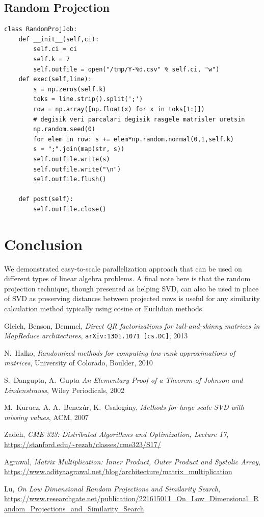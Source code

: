 \documentclass{article}
\begin{document}
\subsection{Random Projection}

\begin{verbatim}
class RandomProjJob:
    def __init__(self,ci):
        self.ci = ci
        self.k = 7
        self.outfile = open("/tmp/Y-%d.csv" % self.ci, "w")        
    def exec(self,line):
        s = np.zeros(self.k)
        toks = line.strip().split(';')
        row = np.array([np.float(x) for x in toks[1:]])
        # degisik veri parcalari degisik rasgele matrisler uretsin
        np.random.seed(0) 
        for elem in row: s += elem*np.random.normal(0,1,self.k) 
        s = ";".join(map(str, s))
        self.outfile.write(s)
        self.outfile.write("\n")
        self.outfile.flush()
        
    def post(self):
        self.outfile.close()
\end{verbatim}

\section{Conclusion}

We demonstrated easy-to-scale parallelization approach that can be used on
different types of linear algebra problems. A final note here is that the random
projection technique, though presented as helping SVD, can also be used in place
of SVD \cite{lu} as preserving distances between projected rows is useful for
any similarity calculation method typically using cosine or Euclidian methods.


  

\begin{thebibliography}{1}

Gleich, Benson, Demmel, \emph{Direct QR factorizations for tall-and-skinny
  matrices in MapReduce architectures}, {\tt arXiv:1301.1071 [cs.DC]}, 2013

N.~Halko, \emph{Randomized methods for computing low-rank approximations of
  matrices}, University of Colorado, Boulder, 2010

S.~Dangupta, A.~Gupta \emph{An Elementary Proof of a Theorem of Johnson and
  Lindenstrauss}, Wiley Periodicals, 2002

M.~Kurucz, A. A.~Benczúr, K.~Csalogány, \emph{Methods for large scale SVD with
missing values}, ACM, 2007

Zadeh, \emph{CME 323: Distributed Algorithms and Optimization, Lecture 17}, 
\url{https://stanford.edu/~rezab/classes/cme323/S17/}

Agrawal, \emph{Matrix Multiplication: Inner Product, Outer Product and Systolic Array},
\url{https://www.adityaagrawal.net/blog/architecture/matrix_multiplication}

Lu, \emph{On Low Dimensional Random Projections and Similarity Search},
    \url{https://www.researchgate.net/publication/221615011_On_Low_Dimensional_Random_Projections_and_Similarity_Search}

\end{thebibliography}
\end{document}
